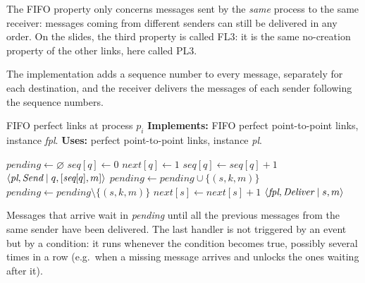 \begin{framedobs}{}
  The FIFO property only concerns messages sent by the \textit{same} process to the same receiver: messages coming from different senders can still be delivered in any order. On the slides, the third property is called FL3: it is the same no-creation property of the other links, here called PL3.
\end{framedobs}

The implementation adds a sequence number to every message, separately for each destination, and the receiver delivers the messages of each sender following the sequence numbers.

\begin{framedalgo}[label={alg:fifo}, unbreakable]{FIFO perfect links at process $p_i$}
  \textbf{Implements:} FIFO perfect point-to-point links, instance \textit{fpl}. \quad \textbf{Uses:} perfect point-to-point links, instance \textit{pl}.
  \begin{algorithmic}[1]
      \State $\textit{pending} \gets \varnothing$
        \State $\textit{seq}[q] \gets 0$ 
        \State $\textit{next}[q] \gets 1$ 
      \EndFor
    \EndUpon
      \State $\textit{seq}[q] \gets \textit{seq}[q] + 1$
      \State \Trigger $\left\langle \textit{pl}, \textit{Send} \mid q, [\textit{seq}[q], m] \right\rangle$
    \EndUpon
      \State $\textit{pending} \gets \textit{pending} \cup \{(s, k, m)\}$
    \EndUpon
      \State $\textit{pending} \gets \textit{pending} \setminus \{(s, k, m)\}$
      \State $\textit{next}[s] \gets \textit{next}[s] + 1$
      \State \Trigger $\left\langle \textit{fpl}, \textit{Deliver} \mid s, m \right\rangle$
    \EndUponCond
  \end{algorithmic}
\end{framedalgo}

Messages that arrive  wait in \textit{pending} until all the previous messages from the same sender have been delivered. The last handler is not triggered by an event but by a condition: it runs whenever the condition becomes true, possibly several times in a row (e.g.\ when a missing message arrives and unlocks the ones waiting after it).

